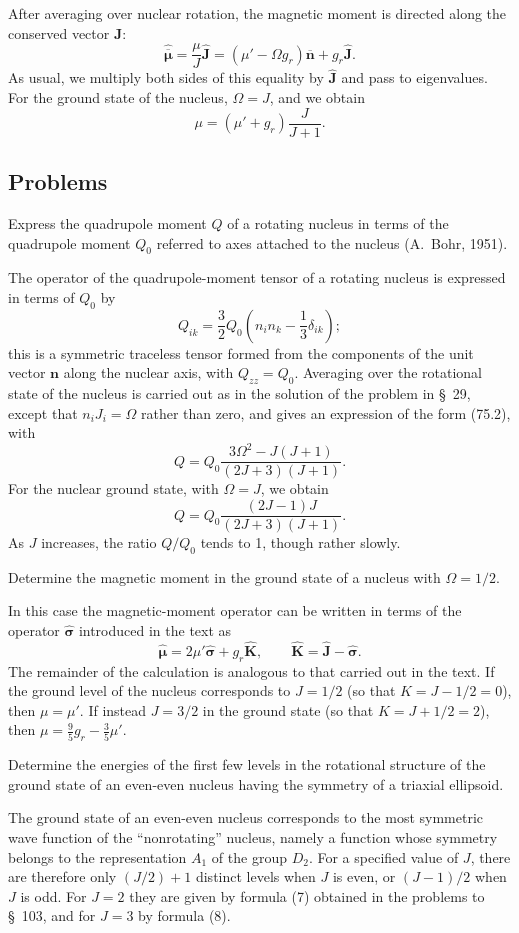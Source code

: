 After averaging over nuclear rotation, the magnetic moment is directed along the conserved vector $\mathbf J$:
\[
 \hat{\overline{\boldsymbol\mu}}
 =\frac\mu J\hat{\mathbf J}
 =(\mu'-\Omega g_r)\overline{\mathbf n}+g_r\hat{\mathbf J}.
\]
As usual, we multiply both sides of this equality by $\hat{\mathbf J}$ and pass to eigenvalues. For the ground state of the nucleus, $\Omega=J$, and we obtain
\begin{equation}
 \mu=(\mu'+g_r)\frac{J}{J+1}.
 \tag{119.6}
\end{equation}

\subsection*{Problems}

 Express the quadrupole moment $Q$ of a rotating nucleus in terms of the quadrupole moment $Q_0$ referred to axes attached to the nucleus (A.~Bohr, 1951).

\SolutionHeading The operator of the quadrupole-moment tensor of a rotating nucleus is expressed in terms of $Q_0$ by
\[
 Q_{ik}=\frac32Q_0\left(n_in_k-\frac13\delta_{ik}\right);
\]
this is a symmetric traceless tensor formed from the components of the unit vector $\mathbf n$ along the nuclear axis, with $Q_{zz}=Q_0$. Averaging over the rotational state of the nucleus is carried out as in the solution of the problem in \S~29, except that $n_iJ_i=\Omega$ rather than zero, and gives an expression of the form (75.2), with
\[
 Q=Q_0\frac{3\Omega^2-J(J+1)}{(2J+3)(J+1)}.
\]
For the nuclear ground state, with $\Omega=J$, we obtain
\[
 Q=Q_0\frac{(2J-1)J}{(2J+3)(J+1)}.
\]
As $J$ increases, the ratio $Q/Q_0$ tends to 1, though rather slowly.

 Determine the magnetic moment in the ground state of a nucleus with $\Omega=1/2$.

\SolutionHeading In this case the magnetic-moment operator can be written in terms of the operator $\hat{\boldsymbol\sigma}$ introduced in the text as
\[
 \hat{\boldsymbol\mu}=2\mu'\hat{\boldsymbol\sigma}+g_r\hat{\mathbf K},
 \qquad \hat{\mathbf K}=\hat{\mathbf J}-\hat{\boldsymbol\sigma}.
\]
The remainder of the calculation is analogous to that carried out in the text. If the ground level of the nucleus corresponds to $J=1/2$ (so that $K=J-1/2=0$), then $\mu=\mu'$. If instead $J=3/2$ in the ground state (so that $K=J+1/2=2$), then $\mu=\frac95g_r-\frac35\mu'$.

 Determine the energies of the first few levels in the rotational structure of the ground state of an even-even nucleus having the symmetry of a triaxial ellipsoid.

\SolutionHeading The ground state of an even-even nucleus corresponds to the most symmetric wave function of the ``nonrotating'' nucleus, namely a function whose symmetry belongs to the representation $A_1$ of the group $D_2$. For a specified value of $J$, there are therefore only $(J/2)+1$ distinct levels when $J$ is even, or $(J-1)/2$ when $J$ is odd. For $J=2$ they are given by formula (7) obtained in the problems to \S~103, and for $J=3$ by formula (8).
